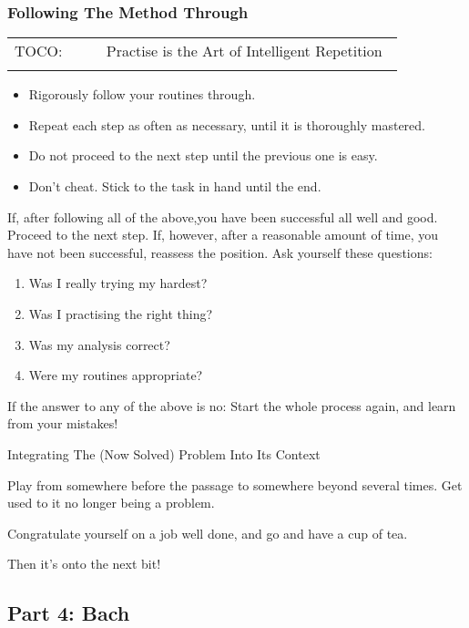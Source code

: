 \documentclass{article}
\begin{document}
\subsubsection{Following The Method Through}

\begin{tabular}{p{0.2\linewidth}p{0.65\linewidth}}
    \\
    TOCO: & Practise is the Art of Intelligent Repetition\\
    \\
\end{tabular}

\begin{itemize}
    \item Rigorously follow your routines through.
    \item Repeat each step as often as necessary, until it is thoroughly mastered.
    \item Do not proceed to the next step until the previous one is easy.
    \item Don't cheat.
        Stick to the task in hand until the end.
\end{itemize}

If, after following all of the above,you have been successful all well and good.
Proceed to the next step.
If, however, after a reasonable amount of  time, you have not been successful, reassess the position.
Ask yourself these questions:

\begin{enumerate}
    \item Was I really trying my hardest?
    \item Was I practising the right thing?
    \item Was my analysis correct?
    \item Were my routines appropriate?
\end{enumerate}

If the answer to any of the above is no: Start the whole process again, and learn from your mistakes!

Integrating The (Now Solved) Problem Into Its Context

Play from somewhere before the passage to somewhere beyond several times.
Get used to it no longer being a problem.

Congratulate yourself on a job well done, and go and have a cup of tea.

Then it's onto the next bit!

\subsection{Part 4: Bach}
\end{document}

